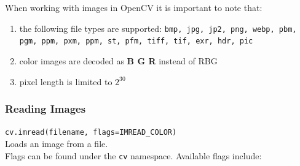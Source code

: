\documentclass{article}
\theoremstyle{definition}
\theoremstyle{remark}
\newcommand{\func}[2]{\noindent\lstinline{#1}\\#2}
\begin{document}
When working with images in OpenCV it is important to note that:

 \begin{enumerate}
    \item the following file types are supported: \lstinline{bmp, jpg, jp2, png, webp, pbm, pgm, ppm, pxm, ppm, st, pfm, tiff, tif, exr, hdr, pic}

    \item color images are decoded as \textbf{B G R} instead of RBG

    \item pixel length is limited to $ 2^{30} $

\end{enumerate}


\subsubsection{Reading Images}


\func{cv.imread(filename, flags=IMREAD_COLOR)}{Loads an image from a file.\\}

\noindent Flags can be found under the \lstinline{cv} namespace.
Available flags include:
\end{document}
